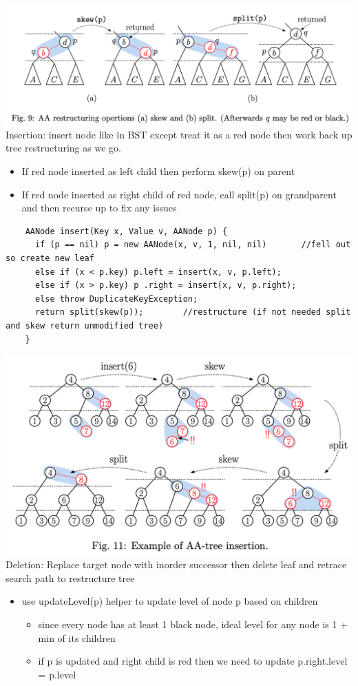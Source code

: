 \documentclass{article}
\begin{document}
  \includegraphics[width=\textwidth]{AASkewSplit}
  Insertion: insert node like in BST except treat it as a red node then work back up tree restructuring as we go. 
  \begin{itemize}[noitemsep]
  \item If red node inserted as left child then perform skew(p) on parent
  \item If red node inserted as right child of red node, call split(p) on grandparent and then recurse up to fix any issues
  \end{itemize}
  \begin{lstlisting}
    AANode insert(Key x, Value v, AANode p) {
      if (p == nil) p = new AANode(x, v, 1, nil, nil)       //fell out so create new leaf
      else if (x < p.key) p.left = insert(x, v, p.left);
      else if (x > p.key) p .right = insert(x, v, p.right);
      else throw DuplicateKeyException;
      return split(skew(p));        //restructure (if not needed split and skew return unmodified tree)
    }
  \end{lstlisting}
  \includegraphics[width=\textwidth]{InsertionAATree}
  Deletion: Replace target node with inorder successor then delete leaf and retrace search path to restructure tree
  \begin{itemize}[noitemsep]
  \item use updateLevel(p) helper to update level of node p based on children
    \begin{itemize}[noitemsep]
      \item since every node has at least 1 black node, ideal level for any node is 1 + min of its children 
      \item if p is updated and right child is red then we need to update p.right.level = p.level
    \end{itemize}
  \end{itemize}
\end{document}
